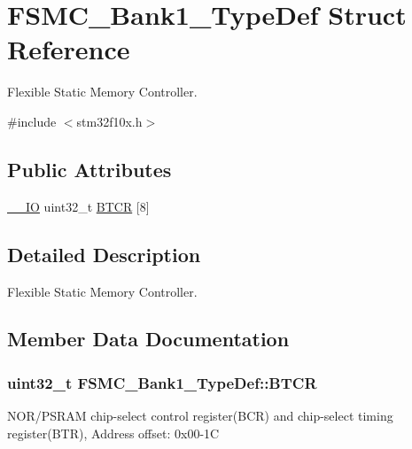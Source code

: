 \hypertarget{struct_f_s_m_c___bank1___type_def}{\section{F\-S\-M\-C\-\_\-\-Bank1\-\_\-\-Type\-Def Struct Reference}
\label{struct_f_s_m_c___bank1___type_def}
}


Flexible Static Memory Controller.  




{\ttfamily \#include $<$stm32f10x.\-h$>$}

\subsection*{Public Attributes}
\begin{DoxyCompactItemize}
\item 
\hyperlink{group___c_m_s_i_s__core__definitions_gaec43007d9998a0a0e01faede4133d6be}{\-\_\-\-\_\-\-I\-O} uint32\-\_\-t \hyperlink{struct_f_s_m_c___bank1___type_def_a3360341d4c7db502fea208cfb48638a3}{B\-T\-C\-R} \mbox{[}8\mbox{]}
\end{DoxyCompactItemize}


\subsection{Detailed Description}
Flexible Static Memory Controller. 

\subsection{Member Data Documentation}
\hypertarget{struct_f_s_m_c___bank1___type_def_a3360341d4c7db502fea208cfb48638a3}{
\subsubsection[{B\-T\-C\-R}]{ uint32\-\_\-t F\-S\-M\-C\-\_\-\-Bank1\-\_\-\-Type\-Def\-::\-B\-T\-C\-R}}\label{struct_f_s_m_c___bank1___type_def_a3360341d4c7db502fea208cfb48638a3}
N\-O\-R/\-P\-S\-R\-A\-M chip-\/select control register(\-B\-C\-R) and chip-\/select timing register(\-B\-T\-R), Address offset\-: 0x00-\/1\-C 

